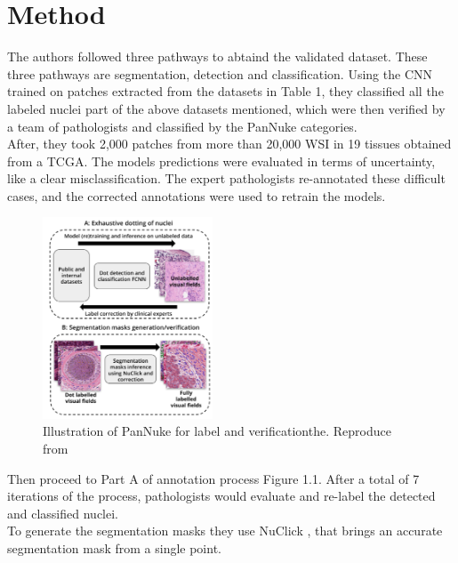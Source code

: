 \documentclass[target=bach,aauheader=,style=]{thud}
\begin{document}
\section{Method}
The authors followed three pathways to abtaind the validated dataset. These three pathways are segmentation, detection and classification. Using the CNN trained on patches extracted from the datasets in Table 1, they classified all the labeled nuclei part of the above datasets mentioned, which were then verified by a team of pathologists and classified by the PanNuke categories.\\
After, they took 2,000 patches from more than 20,000 WSI in 19 tissues obtained from a TCGA.
The models predictions were evaluated in terms of uncertainty, like a clear misclassification. The expert pathologists re-annotated these difficult cases, and the corrected annotations were used to retrain the models. 
\begin{figure}[h] %
    \centering
    \includegraphics[width=0.45\textwidth]{imgs/pannuke_annotations.png}
    \caption{Illustration of PanNuke for label and verificationthe. Reproduce from \cite{gamper2020pannuke}}
    \label{fig:esempio}
\end{figure}
Then proceed to Part A of annotation process Figure 1.1. After a total of 7 iterations of the process, pathologists would evaluate and re-label the detected and classified nuclei.\\
To generate the segmentation masks they use NuClick \cite{jahanifar2019nuclick}, that brings an accurate segmentation mask from a single point. 
\end{document}
